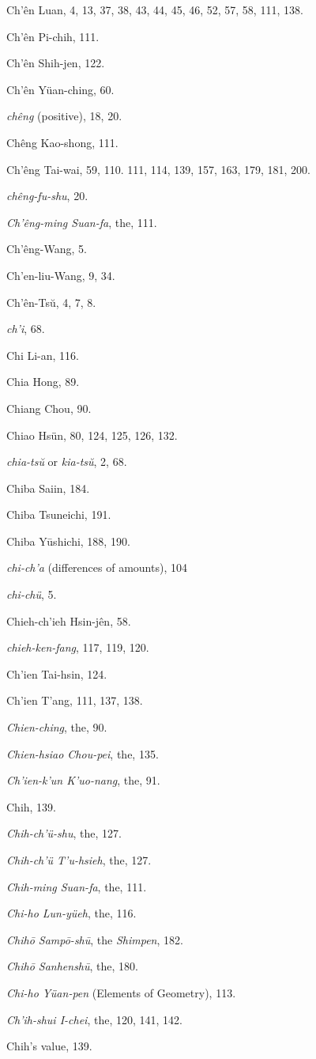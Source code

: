 \documentclass[11pt]{article}
\begin{document}
Ch'ên Luan, 4, 13, 37, 38, 43, 44, 45, 46, 52, 57, 58, 111, 138.\par
Ch'ên Pi-chih, 111.\par
Ch'ên Shih-jen, 122.\par
Ch'ên Yüan-ching, 60.\par
\emph{chêng} (positive), 18, 20.\par
Chêng Kao-shong, 111.\par
Ch'êng Tai-wai, 59, 110. 111, 114, 139, 157, 163, 179, 181, 200.\par
\emph{chêng-fu-shu}, 20.\par
\emph{Ch'êng-ming Suan-fa}, the, 111.\par
Ch'êng-Wang, 5.\par
Ch'en-liu-Wang, 9, 34.\par
Ch'ên-Tsŭ, 4, 7, 8.\par
\emph{ch'i}, 68.\par
Chi Li-an, 116.\par
Chia Hong, 89.\par
Chiang Chou, 90.\par
Chiao Hsün, 80, 124, 125, 126, 132.\par
\emph{chia-tsŭ} or \emph{kia-tsŭ}, 2, 68.\par
Chiba Saiin, 184.\par
Chiba Tsuneichi, 191.\par
Chiba Yūshichi, 188, 190.\par
\emph{chi-ch'a} (differences of amounts), 104\par
\emph{chi-chü}, 5.\par
Chieh-ch'ieh Hsin-jên, 58.\par
\emph{chieh-ken-fang}, 117, 119, 120.\par
Ch'ien Tai-hsin, 124.\par
Ch'ien T'ang, 111, 137, 138.\par
\emph{Chien-ching}, the, 90.\par
\emph{Chien-hsiao Chou-pei}, the, 135.\par
\emph{Ch'ien-k'un K'uo-nang}, the, 91.\par
Chih, 139.\par
\emph{Chih-ch'ü-shu}, the, 127.\par
\emph{Chih-ch'ü T'u-hsieh}, the, 127.\par
\emph{Chih-ming Suan-fa}, the, 111.\par
\emph{Chi-ho Lun-yüeh}, the, 116.\par
\emph{Chihō Sampō-shū}, the \emph{Shimpen}, 182.\par
\emph{Chihō Sanhenshū}, the, 180.\par
\emph{Chi-ho Yüan-pen} (Elements of Geometry), 113.\par
\emph{Ch'ih-shui I-chei}, the, 120, 141, 142.\par
Chih's value, 139.
\end{document}
